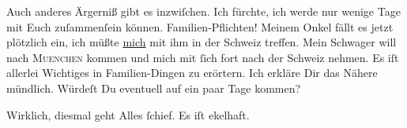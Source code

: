 \pstart
           Auch anderes Ärgerniß gibt es inzwiſchen. Ich fürchte, ich werde nur wenige Tage mit
               Euch zuſammenſein können. Familien-Pflichten! Meinem Onkel fällt es jetzt plötzlich ein, ich
               müßte \uline{mich} mit ihm in der Schweiz treffen. Mein Schwager will nach \textsc{Muenchen} kommen und mich mit{ }ſich fort nach der {\pb}Schweiz nehmen. Es iſt allerlei Wichtiges in
               Familien-Dingen zu erörtern. Ich erkläre Dir das Nähere mündlich. Würdeſt Du
               eventuell auf ein paar Tage \label{K_L02746-4v}\label{K_L02746-4} kommen?\pend
           
\pstart
           Wirklich, diesmal geht Alles{ }ſchief. Es iſt ekelhaft.\pend
           
